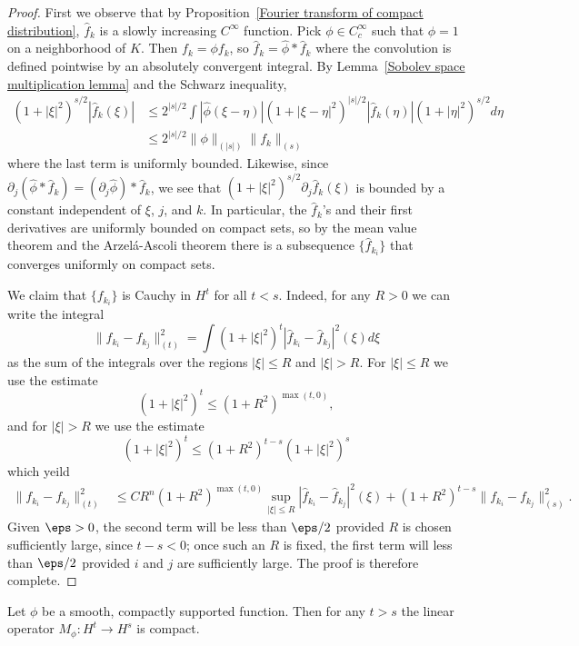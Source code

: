\begin{proof}
First we observe that by Proposition~\ref{Fourier transform of compact distribution}, $\hat{f}_k$ is a slowly increasing $C^\infty$ function. Pick $\phi\in C_c^\infty$ such that $\phi=1$ on a neighborhood of $K$. Then $f_k=\phi f_k$, so $\hat{f}_k=\hat{\phi}\ast\hat{f}_k$ where the convolution is defined pointwise by an absolutely convergent integral. By Lemma~\ref{Sobolev space multiplication lemma} and the Schwarz inequality,
\begin{align*}
(1+|\xi|^2)^{s/2}|\hat{f}_k(\xi)|&\leq 2^{|s|/2}\int|\hat{\phi}(\xi-\eta)|(1+|\xi-\eta|^2)^{|s|/2}|\hat{f}_k(\eta)|(1+|\eta|^2)^{s/2}d\eta\\
&\leq 2^{|s|/2}\|\phi\|_{(|s|)}\|f_k\|_{(s)}
\end{align*}
where the last term is uniformly bounded. Likewise, since $\partial_j(\hat{\phi}\ast\hat{f}_k)=(\partial_j\hat{\phi})\ast\hat{f}_k$, we see that $(1+|\xi|^2)^{s/2}\partial_j\hat{f}_k(\xi)$ is bounded by a constant independent of $\xi$, $j$, and $k$. In particular, the $\hat{f}_k$'s and their first derivatives are uniformly bounded on compact sets, so by the mean value theorem and the Arzel\'a-Ascoli theorem there is a subsequence $\{\hat{f}_{k_i}\}$ that converges uniformly on compact sets.\par
We claim that $\{f_{k_i}\}$ is Cauchy in $H^t$ for all $t<s$. Indeed, for any $R>0$ we can write the integral
\[\|f_{k_i}-f_{k_j}\|_{(t)}^2=\int(1+|\xi|^2)^t|\hat{f}_{k_i}-\hat{f}_{k_j}|^2(\xi)d\xi\]
as the sum of the integrals over the regions $|\xi|\leq R$ and $|\xi|>R$. For $|\xi|\leq R$ we use the estimate
\[(1+|\xi|^2)^t\leq(1+R^2)^{\max(t,0)},\]
and for $|\xi|>R$ we use the estimate
\[(1+|\xi|^2)^t\leq(1+R^2)^{t-s}(1+|\xi|^2)^s\]
which yeild
\begin{align*}
\|f_{k_i}-f_{k_j}\|_{(t)}^2&\leq CR^n(1+R^2)^{\max(t,0)}\sup_{|\xi|\leq R}|\hat{f}_{k_i}-\hat{f}_{k_j}|^2(\xi)+(1+R^2)^{t-s}\|f_{k_i}-f_{k_j}\|_{(s)}^2.
\end{align*}
Given $\eps>0$, the second term will be less than $\eps/2$ provided $R$ is chosen sufficiently large, since $t-s<0$; once such an $R$ is fixed, the first term will less than $\eps/2$ provided $i$ and $j$ are sufficiently large. The proof is therefore complete.
\end{proof}
\begin{corollary}
Let $\phi$ be a smooth, compactly supported function. Then for any $t>s$ the linear operator $M_\phi:H^t\to H^s$ is compact.
\end{corollary}
